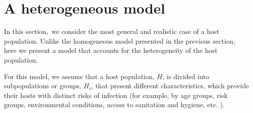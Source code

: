 \documentclass[eng]{MMSB-class-eng}
\begin{document}
\section{A heterogeneous model}
{\color{red}
In this section, we consider the most general and realistic case of a host population. Unlike the homogeneous model presented in the previous section, here we present a model that accounts for the heterogeneity of the host population.

For this model, we assume that a host population, $H$, is divided into subpopulations or groups, $H_i$, that present different characteristics, which provide their hosts with distinct risks of infection (for example, by age groups, risk groups, environmental conditions, access to sanitation and hygiene, etc.
\cite{anderson1992infectious,anderson2014coverage,brooker2006contrasting,freeman2015associations,truscott2014modeling}).

}
\end{document}
